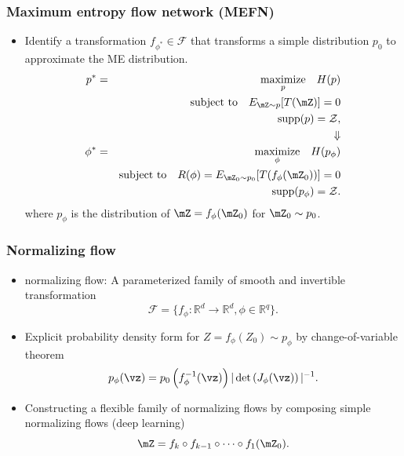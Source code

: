 \documentclass[16pt,presentation]{beamer}
\begin{document}
\begin{frame}
\frametitle{Maximum entropy flow network (MEFN)}
\begin{itemize}
\item Identify a transformation $f_{\phi^*} \in \mathcal{F}$ that transforms a simple distribution $p_0$ to approximate the ME distribution.
\begin{eqnarray*}
p^{*} &=& \underset{p}{\text{maximize}}~~~ H(p) \\
&& \text{subject to} ~~~E_{\mZ\sim p}[T(\mZ)]=0 \nonumber\\
&& ~~~~~~~~~~~~~~~~~~\supp(p)=\mathcal{Z} \nonumber,\\
&&~~~~~~~~\Downarrow\\
\phi^{*} &=& \underset{\phi}{\text{maximize}}~~~ H(p_\phi) \\
&& \text{subject to} ~~~R(\phi) = E_{\mZ_0\sim p_0}[T(f_\phi(\mZ_{0}))]=0 \nonumber\\
&& ~~~~~~~~~~~~~~~~~~\supp(p_\phi)=\mathcal{Z}. \nonumber
\end{eqnarray*}
where $p_\phi$ is the distribution of $\mZ = f_\phi(\mZ_0)$ for $\mZ_0 \sim p_0$.
\end{itemize}
\end{frame}


\begin{frame}
\frametitle{Normalizing flow}
\begin{itemize}
\item \alert{normalizing flow}: A parameterized family of smooth and invertible transformation \[\mathcal{F}=\{f_\phi:  \mathbb{R}^d \rightarrow \mathbb{R}^d, \phi \in \mathbb{R}^q\}.\]
\item Explicit probability density form for $Z = f_\phi(Z_0) \sim p_\phi$ by \alert{change-of-variable theorem}
\[p_\phi(\vz) = p_0\left( f_\phi^{-1}(\vz) \right) | \det \left(J_\phi (\vz)\right) |^{-1}.\]
\item Constructing a flexible family of normalizing flows by composing simple normalizing flows (\alert{deep learning})
\[\mZ = f_{k}\circ f_{k-1}\circ\dots \circ f_{1}(\mZ_{0}).\]
\end{itemize}
\end{frame}
\end{document}
